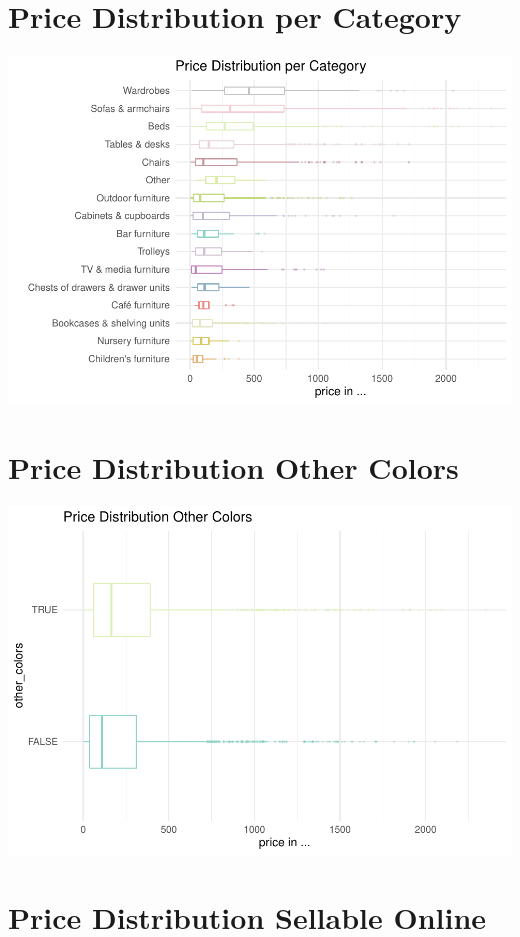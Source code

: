 \documentclass[a4paper, nobind]{templates/ociamthesis}
\begin{document}
\hypertarget{price_distribution_category}{%
\section{Price Distribution per Category}\label{price_distribution_category}}

\includegraphics{_main_files/figure-latex/unnamed-chunk-6-1.pdf}

\hypertarget{price_distribution_other_colors}{%
\section{Price Distribution Other Colors}\label{price_distribution_other_colors}}

\includegraphics{_main_files/figure-latex/unnamed-chunk-7-1.pdf}

\hypertarget{price-distribution-sellable-online}{%
\section{Price Distribution Sellable Online}\label{price-distribution-sellable-online}}
\end{document}
